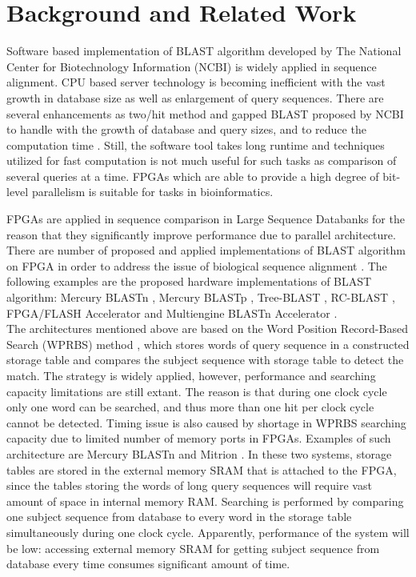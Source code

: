\section{Background and Related Work}
\label{sec:background}


Software based implementation of BLAST algorithm developed by The National Center for Biotechnology Information (NCBI) \cite{ncbiBlast} is widely applied in sequence alignment. CPU based server technology is becoming inefficient with the vast growth in database size as well as enlargement of query sequences. There are several enhancements as two/hit method and gapped BLAST proposed by NCBI to handle with the growth of database and query sizes, and to reduce the computation time \cite{WIENBRANDT20111967}. Still, the software tool takes long runtime and techniques utilized for fast computation is not much useful for such tasks as comparison of several queries at a time. FPGAs which are able to provide a high degree of bit-level parallelism is suitable for tasks in bioinformatics.

\quad FPGAs are applied in sequence comparison in Large Sequence Databanks for the reason that they significantly improve performance due to parallel architecture. There are number of proposed and applied implementations of BLAST algorithm on FPGA in order to address the issue of biological sequence alignment \cite{oliver2005hyper}. The following examples are the proposed hardware implementations of BLAST algorithm: Mercury BLASTn \cite{buhler2007mercury}, Mercury BLASTp \cite{harris2007banded}, Tree-BLAST \cite{herbordt2006single}, RC-BLAST \cite{datta2009}, FPGA/FLASH Accelerator \cite{lavenier2007reconfigurable} and Multiengine BLASTn Accelerator \cite{sotiriades2007design}. 
\\

The architectures mentioned above are based on the Word Position Record-Based Search (WPRBS) method \cite{guo2012systolic}, which stores words of query sequence in a constructed storage table and compares the subject sequence with storage table to detect the match. The strategy is widely applied, however, performance and searching capacity limitations are still extant. The reason is that during one clock cycle only one word can be searched, and thus more than one hit per clock cycle cannot be detected. Timing issue is also caused by shortage in WPRBS searching capacity due to limited number of memory ports in FPGAs. Examples of such architecture are Mercury BLASTn \cite{buhler2007mercury} and Mitrion \cite{guo2012systolic}. In these two systems, storage tables are stored in the external memory SRAM that is attached to the FPGA, since the tables storing the words of long query sequences will require vast amount of space in internal memory RAM. Searching is performed by comparing one subject sequence from database to every word in the storage table simultaneously during one clock cycle. Apparently, performance of the system will be low: accessing external memory SRAM for getting subject sequence from database every time consumes significant amount of time.    
\\    

